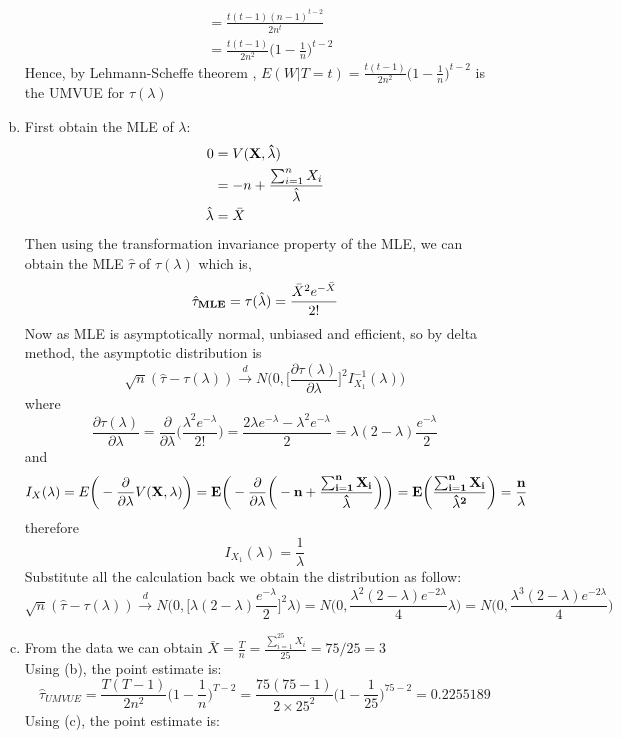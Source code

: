 \documentclass[a4paper,11pt]{article}
\begin{document}
\begin{enumerate}[(a)]
\begin{align*}
			&= \frac{t(t-1)(n-1)^{t-2}}{2n^t}\\
			&= \frac{t(t-1)}{2n^2} \bigg(1-\frac{1}{n}\bigg)^{t -2}
		\end{align*}
		Hence, by Lehmann-Scheffe theorem , $E(W|T=t)= \frac{t(t-1)}{2n^2} \bigg(1-\frac{1}{n}\bigg)^{t-2}$ is the UMVUE for $\tau (\lambda)$
	\item
		First obtain the MLE of $\lambda $:
		\begin{align*}
			0 &= V(\bf{X},\hat{\lambda})\\
			&= -n + \frac{\sum^n_{i=1} X_i}{\hat{\lambda}}\\
			\hat{\lambda} &= \bar{X}
		\end{align*}
		Then using the transformation invariance property of the MLE, we can obtain the MLE $\hat{\tau}$ of $\tau(\lambda)$ which is,
		\[
		\hat{\tau} _{\bf{MLE}}= \tau(\hat{\lambda}) = \frac{\bar{X}^2e^{-\bar{X}}}{2!}
		\]
		Now as MLE is asymptotically normal, unbiased and efficient, so by delta method, the asymptotic distribution is
		\[
		\sqrt{n}(\hat{\tau} - \tau(\lambda)) \xrightarrow{d} N\bigg( 0 , \bigg[ \frac{\partial \tau(\lambda)}{\partial \lambda} \bigg]^2 I_{X_1}^{-1}(\lambda)\bigg)
		\]
		where
		\[
		\frac{\partial \tau(\lambda)}{\partial \lambda} = \frac{\partial}{\partial \lambda} \bigg(  \frac{\lambda^2e^{-\lambda}}{2!} \bigg) = \frac{2\lambda e^{-\lambda} - \lambda^2e^{-\lambda}}{2} = \lambda (2-\lambda) \frac{e^{-\lambda} }{2}
		\]
		and
		\[
		I_{X}(\lambda) = E\bigg(-\frac{\partial}{\partial \lambda} V(\bf{X},\lambda) \bigg) = E\bigg(-\frac{\partial}{\partial \lambda} \bigg( -n + \frac{\sum^n_{i=1} X_i}{\hat{\lambda}} \bigg) \bigg) = E\bigg(  \frac{\sum^n_{i=1} X_i}{\hat{\lambda}^2} \bigg) = \frac{n}{\lambda}
		\]
		therefore
		\[
		I_{X_1}(\lambda) = \frac{1}{\lambda}
		\]
		Substitute all the calculation back we obtain the distribution as follow:
		\[
		\sqrt{n}(\hat{\tau} - \tau(\lambda)) \xrightarrow{d} N\bigg( 0 , \bigg[ \lambda (2-\lambda) \frac{e^{-\lambda} }{2}\bigg]^2 \lambda \bigg)= N\bigg(0, \frac{\lambda^2(2-\lambda)e^{-2\lambda} }{4}\lambda \bigg) = N\bigg(0, \frac{\lambda^3(2-\lambda)e^{-2\lambda} }{4} \bigg)
		\]
	\item
		From the data we can obtain $\bar{X} = \frac{T}{n} = \frac{\sum^{25}_{i=1} X_i}{25} = 75/25 = 3$
		\\Using (b), the point estimate is:
		\[
		\hat{\tau}_{UMVUE} = \frac{T(T-1)}{2n^2} \bigg(1-\frac{1}{n}\bigg)^{T-2}=  \frac{75(75-1)}{2\times 25^2} \bigg(1-\frac{1}{25}\bigg)^{75-2}=0.2255189
		\]
		Using (c), the point estimate is:

\end{enumerate}
\end{document}
